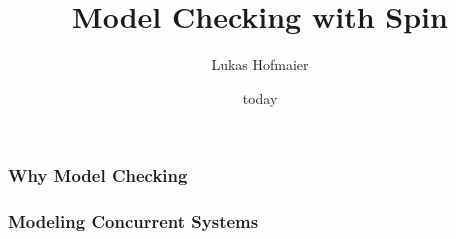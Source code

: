 \documentclass{beamer}
\title{Model Checking with Spin}
\author{Lukas Hofmaier}
\date{today}
\begin{document}
\maketitle
\begin{frame}
  \frametitle{Why Model Checking}
\end{frame}
\begin{frame}
  \frametitle{Modeling Concurrent Systems}
  
\end{frame}
\end{document}
